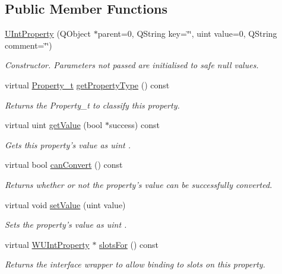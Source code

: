 \subsection*{Public Member Functions}
\begin{DoxyCompactItemize}
\item 
\hyperlink{class_u_int_property_a6f8d978c3fe5ba65656323690a2c580b}{U\-Int\-Property} (Q\-Object $\ast$parent=0, Q\-String key=\char`\"{}\char`\"{}, uint value=0, Q\-String comment=\char`\"{}\char`\"{})
\begin{DoxyCompactList}\small\item\em Constructor. Parameters not passed are initialised to safe null values. \end{DoxyCompactList}\item 
virtual \hyperlink{group___property_classes_ga38f1ccddda12c7cb50b868c9f789ee37}{Property\-\_\-t} \hyperlink{class_u_int_property_a3c42cb68115d9ac7fec4887de32d867e}{get\-Property\-Type} () const 
\begin{DoxyCompactList}\small\item\em Returns the Property\-\_\-t to classify this property. \end{DoxyCompactList}\item 
virtual uint \hyperlink{class_u_int_property_a9f1ce8733358de31a642990168f3f61d}{get\-Value} (bool $\ast$success) const 
\begin{DoxyCompactList}\small\item\em Gets this property's value as uint . \end{DoxyCompactList}\item 
virtual bool \hyperlink{class_u_int_property_a3f9986864fcd8cbfefd69245dc7aadfe}{can\-Convert} () const 
\begin{DoxyCompactList}\small\item\em Returns whether or not the property's value can be successfully converted. \end{DoxyCompactList}\item 
virtual void \hyperlink{class_u_int_property_a074ce84b6839d2451a3abee9da289198}{set\-Value} (uint value)
\begin{DoxyCompactList}\small\item\em Sets the property's value as uint . \end{DoxyCompactList}\item 
virtual \hyperlink{class_w_u_int_property}{W\-U\-Int\-Property} $\ast$ \hyperlink{class_u_int_property_a8625bb395e98f5db5b4963a40d7ced32}{slots\-For} () const 
\begin{DoxyCompactList}\small\item\em Returns the interface wrapper to allow binding to slots on this property. \end{DoxyCompactList}\end{DoxyCompactItemize}

